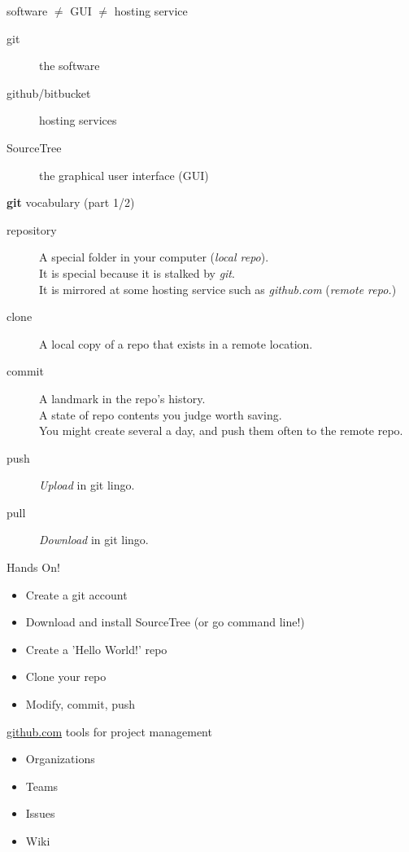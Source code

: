 \documentclass[11pt]{beamer}
\begin{document}
\begin{frame}{software $\neq$ GUI $\neq$ hosting service}
\begin{description}
\item[git]{the software}
\item[github/bitbucket]{hosting services}
\item[SourceTree]{the graphical user interface (GUI)}
\end{description}
\end{frame}

\begin{frame}{\textbf{git} vocabulary (part 1/2)}
\begin{description}
\item[repository]{A special folder in your computer (\textit{local repo}). \\ It is special because it is stalked by \textit{git}.\\ It is mirrored at some hosting service such as \textit{github.com} (\textit{remote repo.})} \pause
\item[clone]{A local copy of a repo that exists in a remote location.} \pause
\item[commit]{A landmark in the repo's history. \\A state of repo contents you judge worth saving. \\ You might create several a day, and push them often to the remote repo.} \pause
\item[push]{\textit{Upload} in git lingo.} \pause
\item[pull]{\textit{Download} in git lingo.}
\end{description}
\end{frame}

\begin{frame}{Hands On!}
\begin{itemize}
\item Create a git account
\item Download and install SourceTree (or go command line!)
\item Create a 'Hello World!' repo
\item Clone your repo
\item Modify, commit, push
\end{itemize}
\end{frame}

\begin{frame}{\url{github.com} tools for project management}
\begin{itemize}
\item Organizations
\item Teams
\item Issues
\item Wiki
\end{itemize}
\end{frame}
\end{document}
